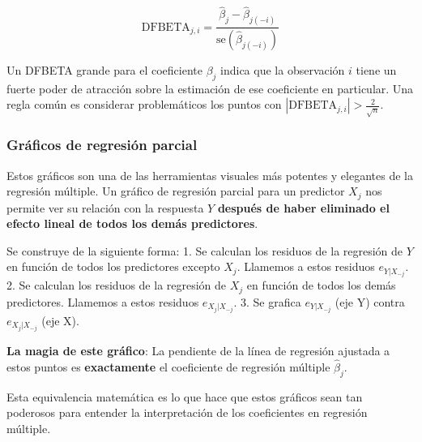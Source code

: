 \documentclass[
  letterpaper,
  DIV=11,
  numbers=noendperiod]{scrreprt}
\begin{document}
\[\text{DFBETA}_{j,i} = \frac{\hat{\beta}_j - \hat{\beta}_{j(-i)}}{\text{se}(\hat{\beta}_{j(-i)})}\]

Un DFBETA grande para el coeficiente \(\beta_j\) indica que la
observación \(i\) tiene un fuerte poder de atracción sobre la estimación
de ese coeficiente en particular. Una regla común es considerar
problemáticos los puntos con
\(|\text{DFBETA}_{j,i}| > \frac{2}{\sqrt{n}}\).

\subsubsection{Gráficos de regresión
parcial}\label{gruxe1ficos-de-regresiuxf3n-parcial}

Estos gráficos son una de las herramientas visuales más potentes y
elegantes de la regresión múltiple. Un gráfico de regresión parcial para
un predictor \(X_j\) nos permite ver su relación con la respuesta \(Y\)
\textbf{después de haber eliminado el efecto lineal de todos los demás
predictores}.

Se construye de la siguiente forma: 1. Se calculan los residuos de la
regresión de \(Y\) en función de todos los predictores excepto \(X_j\).
Llamemos a estos residuos \(e_{Y|X_{-j}}\). 2. Se calculan los residuos
de la regresión de \(X_j\) en función de todos los demás predictores.
Llamemos a estos residuos \(e_{X_j|X_{-j}}\). 3. Se grafica
\(e_{Y|X_{-j}}\) (eje Y) contra \(e_{X_j|X_{-j}}\) (eje X).

\begin{tcolorbox}[enhanced jigsaw, leftrule=.75mm, breakable, colbacktitle=quarto-callout-warning-color!10!white, bottomrule=.15mm, colframe=quarto-callout-warning-color-frame, toprule=.15mm, colback=white, coltitle=black, bottomtitle=1mm, left=2mm, title=\textcolor{quarto-callout-warning-color}{\faExclamationTriangle}\hspace{0.5em}{Propiedad clave de los gráficos de regresión parcial}, opacityback=0, arc=.35mm, opacitybacktitle=0.6, toptitle=1mm, titlerule=0mm, rightrule=.15mm]

\textbf{La magia de este gráfico}: La pendiente de la línea de regresión
ajustada a estos puntos es \textbf{exactamente} el coeficiente de
regresión múltiple \(\hat{\beta}_j\).

Esta equivalencia matemática es lo que hace que estos gráficos sean tan
poderosos para entender la interpretación de los coeficientes en
regresión múltiple.

\end{tcolorbox}
\end{document}
